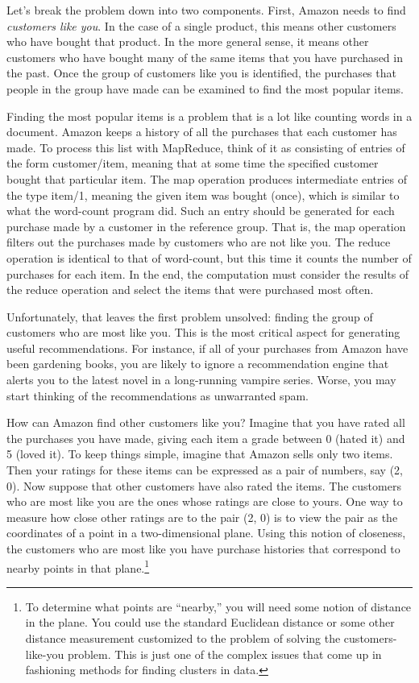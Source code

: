 Let's break the problem down into
two components.  First, Amazon
needs to find \emph{customers like you}.
In the case of a single product, this means other customers who
have bought that product.  In the more general sense,
it means other customers who have bought many
of the same items that you have purchased in the past.
Once the group of
customers like you is identified, the purchases
that people in the group have made can be examined
to find the most popular items.

Finding the most popular items is a problem that is a lot like
counting words in a document.
Amazon keeps a history of all the purchases that each
customer has made.  To process this list with MapReduce, think of it as
consisting of entries of the form customer/item, meaning that at some time the specified
customer bought that particular item.
The map operation produces intermediate entries of the type item/1, meaning
the given item was bought (once),
which is similar to what the word-count program did.
Such an entry should be generated for
each purchase made by a customer in the reference group.  That is,
the map operation filters out the purchases made by customers who are
not like you. The reduce operation is identical to that of word-count,
but this time it counts the number of purchases for each item.
In the end, the computation must consider the results of the reduce operation
and select the items that were purchased most often.

Unfortunately, that leaves the first problem unsolved: finding the group of
customers who are most like you.  This is the most critical aspect for
generating useful recommendations.  For instance, if all of your purchases
from Amazon have been gardening books, you are likely to ignore a
recommendation engine that alerts you to the latest novel in a long-running
vampire series.  Worse, you may start thinking of the recommendations
as unwarranted spam.

How can Amazon find other customers like you?  Imagine that
you have rated all the purchases you have made, giving each item a grade between
0 (hated it) and 5 (loved it).  To keep things simple, imagine that Amazon
sells only two items.  Then your ratings for these items can be expressed as
a pair of numbers, say (2, 0).  Now suppose that other customers have also
rated the items.  The customers who are most like you are the ones
whose ratings are close to yours.
One way to measure how close other ratings are to the pair (2, 0)
is to view the pair
as the coordinates of a point in a two-dimensional plane.
Using this notion of closeness, the customers who
are most like you have purchase histories that correspond to nearby
points in that plane.\footnote{To
determine what points are ``nearby,'' you will need
some notion of distance in the plane. You could use the standard
Euclidean distance or some other distance measurement customized
to the problem of solving the customers-like-you problem.
This is just one of the complex issues that come up
in fashioning methods for finding clusters in data.}

